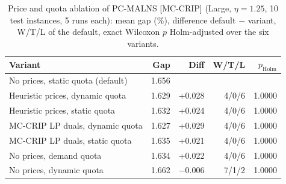 \begin{table}[!htb]
\centering
\caption{Price and quota ablation of PC-MALNS [MC-CRIP] (Large, $\eta = 1.25$, 10 test instances, 5 runs each): mean gap (\%), difference default $-$ variant, W/T/L of the default, exact Wilcoxon $p$ Holm-adjusted over the six variants.}
\label{tab:ablation}
\footnotesize
\begin{tabular}{@{}lrrrr@{}}
\toprule
Variant & Gap & Diff & W/T/L & $p_{\text{Holm}}$ \\
\midrule
No prices, static quota (default) & 1.656 & & & \\
Heuristic prices, dynamic quota & 1.629 & +0.028 & 4/0/6 & 1.0000 \\
Heuristic prices, static quota & 1.632 & +0.024 & 4/0/6 & 1.0000 \\
MC-CRIP LP duals, dynamic quota & 1.627 & +0.029 & 4/0/6 & 1.0000 \\
MC-CRIP LP duals, static quota & 1.635 & +0.021 & 4/0/6 & 1.0000 \\
No prices, demand quota & 1.634 & +0.022 & 4/0/6 & 1.0000 \\
No prices, dynamic quota & 1.662 & $-$0.006 & 7/1/2 & 1.0000 \\
\bottomrule
\end{tabular}
\end{table}
